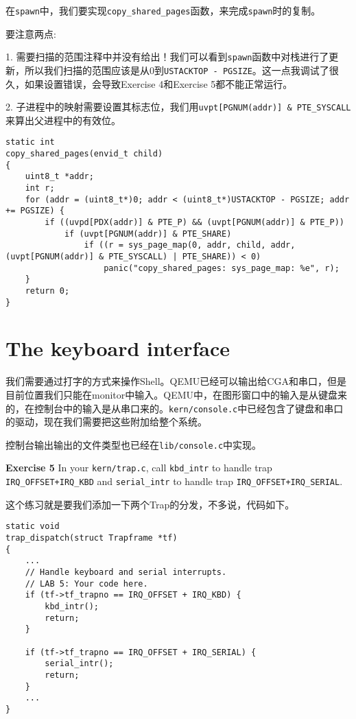\documentclass[11pt]{article}
\begin{document}
在\lstinline|spawn|中，我们要实现\lstinline|copy_shared_pages|函数，来完成\lstinline|spawn|时的复制。

要注意两点:

1. 需要扫描的范围注释中并没有给出！我们可以看到\lstinline|spawn|函数中对栈进行了更新，所以我们扫描的范围应该是从0到\lstinline|USTACKTOP - PGSIZE|。这一点我调试了很久，如果设置错误，会导致Exercise 4和Exercise 5都不能正常运行。

2. 子进程中的映射需要设置其标志位，我们用\lstinline|uvpt[PGNUM(addr)] & PTE_SYSCALL|来算出父进程中的有效位。
\begin{lstlisting}[title=lib/spawn.c]
static int
copy_shared_pages(envid_t child)
{
	uint8_t *addr;
	int r;
	for (addr = (uint8_t*)0; addr < (uint8_t*)USTACKTOP - PGSIZE; addr += PGSIZE) {
		if ((uvpd[PDX(addr)] & PTE_P) && (uvpt[PGNUM(addr)] & PTE_P))
			if (uvpt[PGNUM(addr)] & PTE_SHARE)
				if ((r = sys_page_map(0, addr, child, addr, (uvpt[PGNUM(addr)] & PTE_SYSCALL) | PTE_SHARE)) < 0)
					panic("copy_shared_pages: sys_page_map: %e", r);
	}
	return 0;
}
\end{lstlisting}

\section{The keyboard interface}
我们需要通过打字的方式来操作Shell。QEMU已经可以输出给CGA和串口，但是目前位置我们只能在monitor中输入。QEMU中，在图形窗口中的输入是从键盘来的，在控制台中的输入是从串口来的。\lstinline|kern/console.c|中已经包含了键盘和串口的驱动，现在我们需要把这些附加给整个系统。

控制台输出输出的文件类型也已经在\lstinline|lib/console.c|中实现。

\begin{framed}
\noindent\textbf{Exercise 5} In your \lstinline|kern/trap.c|, call \lstinline|kbd_intr| to handle trap \lstinline|IRQ_OFFSET+IRQ_KBD| and \lstinline|serial_intr| to handle trap \lstinline|IRQ_OFFSET+IRQ_SERIAL|.
\end{framed}

这个练习就是要我们添加一下两个Trap的分发，不多说，代码如下。
\begin{lstlisting}[title=kern/trap.c]
static void
trap_dispatch(struct Trapframe *tf)
{
	...
	// Handle keyboard and serial interrupts.
	// LAB 5: Your code here.
	if (tf->tf_trapno == IRQ_OFFSET + IRQ_KBD) {
		kbd_intr();
		return;
	}

	if (tf->tf_trapno == IRQ_OFFSET + IRQ_SERIAL) {
		serial_intr();
		return;
	}
	...
}
\end{lstlisting}
\end{document}
